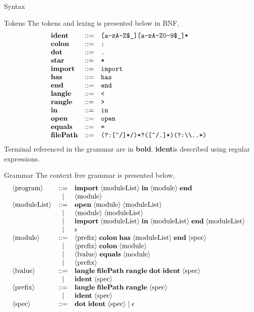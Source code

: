 \documentclass[11pt]{article}
\newcommand\DOT{\textbf{dot}}
\newcommand\COLON{\textbf{colon}}
\newcommand\STAR{\textbf{star}}
\newcommand\IDENT{\textbf{ident}}
\newcommand\HAS{\textbf{has}}
\newcommand\IMPORT{\textbf{import}}
\newcommand\END{\textbf{end}}
\newcommand\LANGLE{\textbf{langle}}
\newcommand\RANGLE{\textbf{rangle}}
\newcommand\IN{\textbf{in}}
\newcommand\OPEN{\textbf{open}}
\newcommand\EQ{\textbf{equals}}
\newcommand\FILEPATH{\textbf{filePath}}
\newcommand\nonterm[1]{\langle\textnormal{#1}\rangle}
\begin{document}
\begin{section}{Syntax}
\begin{subsection}{Tokens}
The tokens and lexing is presented below in BNF, 
\[
\begin{array}{lcl}
\IDENT & ::= & \verb|[a-zA-Z$_][a-zA-Z0-9$_]*|\\
\COLON & ::= & \verb|:|\\
\DOT & ::= & \verb|.|\\
\STAR & ::= & \verb|*|\\
\IMPORT & ::= &\verb|import|\\
\HAS & ::= & \verb|has|\\
\END & ::= &\verb|end|\\
\LANGLE & ::= &\verb|<|\\
\RANGLE & ::= &\verb|>|\\
\IN & ::= &\verb|in|\\
\OPEN & ::= &\verb|open|\\
\EQ & ::= &\verb|=|\\
\FILEPATH & ::= &\verb"(?:[^/]*/)*?([^/.]*)(?:\\..*)"
\end{array}
\]
Terminal referenced in the grammar are in \textbf{bold}. \IDENT\;is described using regular expressions.\\
\end{subsection}
\begin{subsection}{Grammar}
The context free grammar is presented below,
\[
\begin{array}{lcl}
\nonterm{program} & ::= & \IMPORT\;\nonterm{moduleList}\;\IN\;\nonterm{module}\;\END\\
& | & \nonterm{module}\\ 
\nonterm{moduleList} & ::=  & \OPEN\;\nonterm{module}\;\nonterm{moduleList}\\
& | & \nonterm{module}\;\nonterm{moduleList}\\
& | & \IMPORT\;\nonterm{moduleList}\;\IN\;\nonterm{moduleList}\;\END\;\nonterm{moduleList}\\
& | & \epsilon\\
\nonterm{module} & ::= & \nonterm{prefix}\;\COLON\;\HAS\;\nonterm{moduleList}\;\END\;\nonterm{spec}\\
& | & \nonterm{prefix}\;\COLON\;\nonterm{module}\\
& | & \nonterm{lvalue}\;\EQ\;\nonterm{module}\\
& | & \nonterm{prefix}\\
\nonterm{lvalue} & ::= & \LANGLE\;\FILEPATH\;\RANGLE\;\DOT\;\IDENT\;\nonterm{spec}\\
& | & \IDENT\;\nonterm{spec}\\
\nonterm{prefix} & ::= & \LANGLE\;\FILEPATH\;\RANGLE\;\nonterm{spec}\\
& | & \IDENT\;\nonterm{spec}\\
\nonterm{spec} & ::= & \DOT\;\IDENT\;\nonterm{spec}\;|\;\epsilon
\end{array}
\]


\end{subsection}
\end{section}
\end{document}

